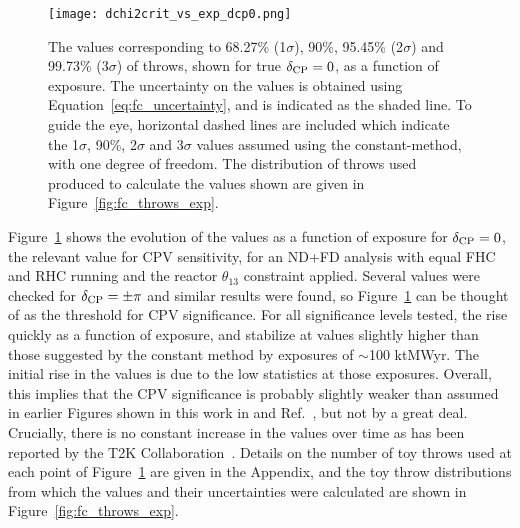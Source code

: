 \begin{figure}[htbp]
  \centering
  \texttt{[image: dchi2crit\_vs\_exp\_dcp0.png]}
  \caption{The \dchisqcrit values corresponding to 68.27\% (1$\sigma$), 90\%, 95.45\% (2$\sigma$) and 99.73\% (3$\sigma$) of throws, shown for true $\delta_{\rm CP} = 0$, as a function of exposure. The uncertainty on the \dchisqcrit values is obtained using Equation~\ref{eq:fc_uncertainty}, and is indicated as the shaded line. To guide the eye, horizontal dashed lines are included which indicate the 1$\sigma$, 90\%, 2$\sigma$ and 3$\sigma$ \dchisq values assumed using the constant-\dchisq method, with one degree of freedom. The distribution of throws used produced to calculate the \dchisqcrit values shown are given in Figure~\ref{fig:fc_throws_exp}.}
  \label{fig:fc_vs_exp}
\end{figure}
Figure~\ref{fig:fc_vs_exp} shows the evolution of the \dchisqcrit values as a function of exposure for $\delta_{\rm CP} = 0$, the relevant value for CPV sensitivity, for an ND+FD analysis with equal FHC and RHC running and the reactor $\theta_{13}$ constraint applied. Several values were checked for $\delta_{\rm CP} = \pm\pi$ and similar results were found, so Figure~\ref{fig:fc_vs_exp} can be thought of as the threshold for CPV significance. For all significance levels tested, the \dchisqcrit rise quickly as a function of exposure, and stabilize at values slightly higher than those suggested by the constant \dchisq method by exposures of $\sim$100 ktMWyr. The initial rise in the \dchisqcrit values is due to the low statistics at those exposures. Overall, this implies that the CPV significance is probably slightly weaker than assumed in earlier Figures shown in this work in and Ref.~\cite{Abi:2020qib}, but not by a great deal. Crucially, there is no constant increase in the \dchisqcrit values over time as has been reported by the T2K Collaboration~\cite{Abe:2021gky}. Details on the number of toy throws used at each point of Figure~\ref{fig:fc_vs_exp} are given in the Appendix, and the toy throw distributions from which the \dchisqcrit values and their uncertainties were calculated are shown in Figure~\ref{fig:fc_throws_exp}.

